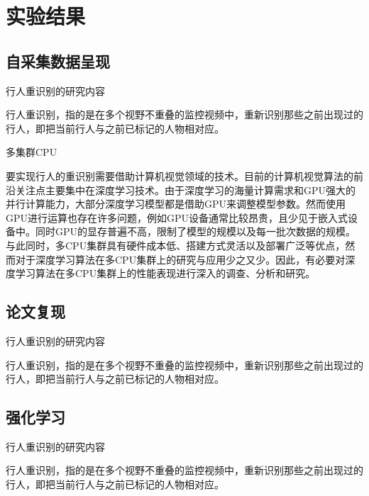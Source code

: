 \section{实验结果}

\subsection{自采集数据呈现}

    \begin{frame}{行人重识别的研究内容}
    \begin{block}{}
    行人重识别，指的是在多个视野不重叠的监控视频中，重新识别那些之前出现过的行人，即把当前行人与之前已标记的人物相对应。
    \end{block}
    \end{frame}

    \begin{frame}{多集群CPU}
    \begin{block}{}
    要实现行人的重识别需要借助计算机视觉领域的技术。目前的计算机视觉算法的前沿关注点主要集中在深度学习技术。由于深度学习的海量计算需求和GPU强大的并行计算能力，大部分深度学习模型都是借助GPU来调整模型参数。然而使用GPU进行运算也存在许多问题，例如GPU设备通常比较昂贵，且少见于嵌入式设备中。同时GPU的显存普遍不高，限制了模型的规模以及每一批次数据的规模。与此同时，多CPU集群具有硬件成本低、搭建方式灵活以及部署广泛等优点，然而对于深度学习算法在多CPU集群上的研究与应用少之又少。因此，有必要对深度学习算法在多CPU集群上的性能表现进行深入的调查、分析和研究。
    \end{block}
    \end{frame}

\subsection{论文复现}

    \begin{frame}{行人重识别的研究内容}
    \begin{block}{}
    行人重识别，指的是在多个视野不重叠的监控视频中，重新识别那些之前出现过的行人，即把当前行人与之前已标记的人物相对应。
    \end{block}
    \end{frame}

\subsection{强化学习}

    \begin{frame}{行人重识别的研究内容}
    \begin{block}{}
    行人重识别，指的是在多个视野不重叠的监控视频中，重新识别那些之前出现过的行人，即把当前行人与之前已标记的人物相对应。
    \end{block}
    \end{frame}
